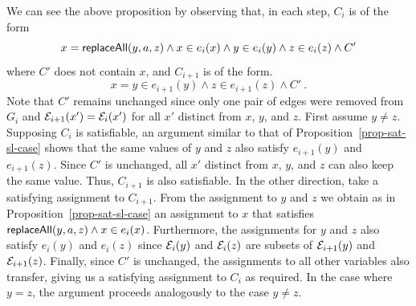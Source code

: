 We can see the above proposition by observing that, in each step, $C_i$ is of the form
\[
    x = \mathsf{replaceAll}(y, a, z) \wedge x \in e_i(x) \wedge y \in e_i(y) \wedge z \in e_i(z) \wedge C'
\]
where $C'$ does not contain $x$, and $C_{i+1}$ is of the form.
\[
    x = y \in e_{i+1}(y) \wedge z \in e_{i+1}(z) \wedge C' \ .
\]
Note that $C'$ remains unchanged since only one pair of edges were removed from $G_i$ and $\mathcal{E}_{i+1}(x') = \mathcal{E}_i(x')$ for all $x'$ distinct from $x$, $y$, and $z$.
First assume $y \neq z$.
Supposing $C_i$ is satisfiable, an argument similar to that of Proposition~\ref{prop-sat-sl-case} shows that the same values of $y$ and $z$ also satisfy $e_{i+1}(y)$ and $e_{i+1}(z)$.
Since $C'$ is unchanged, all $x'$ distinct from $x$, $y$, and $z$ can also keep the same value.
Thus, $C_{i+1}$ is also satisfiable.
In the other direction, take a satisfying assignment to $C_{i+1}$.
From the assignment to $y$ and $z$ we obtain as in Proposition~\ref{prop-sat-sl-case} an assignment to $x$ that satisfies $\mathsf{replaceAll}(y, a, z) \wedge x \in e_i(x)$.
Furthermore, the assignments for $y$ and $z$ also satisfy $e_i(y)$ and $e_i(z)$ since $\mathcal{E}_i(y)$ and $\mathcal{E}_i(z)$ are subsets of $\mathcal{E}_{i+1}(y)$ and $\mathcal{E}_{i+1}(z)$.
Finally, since $C'$ is unchanged, the assignments to all other variables also transfer, giving us a satisfying assignment to $C_i$ as required.
In the case where $y = z$, the argument proceeds analogously to the case $y \neq z$.
